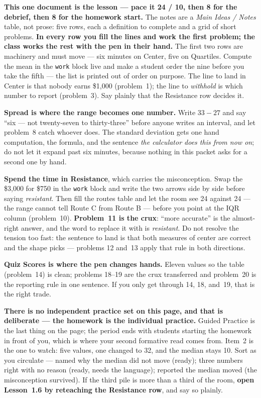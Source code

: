 \documentclass[10pt]{article}
\begin{document}
\begin{teachernote}
\textbf{This one document is the lesson --- pace it 24 / 10, then 8 for the debrief, then 8 for
the homework start.} The notes are a \emph{Main Ideas / Notes} table, not prose: five rows, each
a definition to complete and a grid of short problems. \textbf{In every row you fill the lines
and work the first problem; the class works the rest with the pen in their hand.} The first two
rows are machinery and must move --- six minutes on Center, five on Quartiles. Compute the mean
in the \texttt{work} block live and make a student order the nine before you take the fifth ---
the list is printed out of order on purpose. The line to land in Center is that nobody earns
\$1{,}000 (problem~1); the line to \emph{withhold} is which number to report (problem~3). Say
plainly that the Resistance row decides it.

\textbf{Spread is where the range becomes one number.} Write $33 - 27$ and say ``six --- not
twenty-seven to thirty-three'' before anyone writes an interval, and let problem~8 catch whoever
does. The standard deviation gets one hand computation, the formula, and the sentence \emph{the
calculator does this from now on}; do not let it expand past six minutes, because nothing in
this packet asks for a second one by hand.

\textbf{Spend the time in Resistance}, which carries the misconception. Swap the \$3{,}000 for
\$750 in the \texttt{work} block and write the two arrows side by side before saying
\emph{resistant}. Then fill the routes table and let the room see 24 against 24 --- the range
cannot tell Route C from Route B --- before you point at the IQR column (problem~10).
\textbf{Problem~11 is the crux}: ``more accurate'' is the almost-right answer, and the word to
replace it with is \emph{resistant}. Do not resolve the tension too fast: the sentence to land is
that both measures of center are correct and the shape picks --- problems 12 and~13 apply that
rule in both directions.

\textbf{Quiz Scores is where the pen changes hands.} Eleven values so the table (problem~14) is
clean; problems 18--19 are the crux transferred and problem~20 is the reporting rule in one
sentence. If you only get through 14, 18, and~19, that is the right trade.

\textbf{There is no independent practice set on this page, and that is deliberate --- the
homework is the individual practice.} Guided Practice is the last thing on the page; the period
ends with students starting the homework in front of you, which is where your second formative
read comes from. Item~2 is the one to watch: five values, one changed to 32, and the median stays
10. Sort as you circulate --- named why the median did not move (ready); three numbers right with
no reason (ready, needs the language); reported the median moved (the misconception survived).
If the third pile is more than a third of the room, \textbf{open Lesson~1.6 by reteaching the
Resistance row}, and say so plainly.


\end{teachernote}
\end{document}
